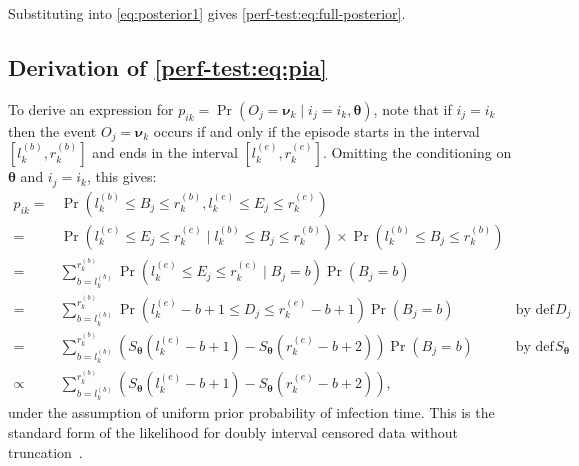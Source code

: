 \documentclass{article}
\def\dist{\sim}
\DeclareMathOperator{\prob}{\mathrm{Pr}}
\DeclareMathOperator{\NBr}{NegBin}
\newcommand{\NBc}{\NBr}
\newcommand\set{\mathcal}
\renewcommand{\vec}[1]{\bm{#1}}
\newcommand{\ntot}{n_\text{tot}}
\newcommand{\ndet}{n_\text{d}}
\newcommand{\pnodet}{p_\text{u}}
\newcommand{\na}{\vec{n}_\text{obs}}
\begin{document}
Substituting into \cref{eq:posterior1} gives \cref{perf-test:eq:full-posterior}.


\subsection{Derivation of \cref{perf-test:eq:pia}}

To derive an expression for $p_{ik} = \prob(O_j = \vec{\nu}_k \mid i_j = i_k, \vec{\theta})$, note that if $i_j = i_k$ then the event $O_j = \vec{\nu}_k$ occurs if and only if the episode starts in the interval $[l^{(b)}_k, r^{(b)}_k]$ and ends in the interval $[l^{(e)}_k, r^{(e)}_k]$.
Omitting the conditioning on $\vec{\theta}$ and $i_j = i_k$, this gives:
\begin{align}
p_{ik}
=& \prob \left( l_k^{(b)} \leq B_{j} \leq r_k^{(b)}, l_k^{(e)} \leq E_{j} \leq r_k^{(e)} \right) \\
=& \prob \left( l_k^{(e)} \leq E_{j} \leq r_k^{(e)} \mid l_k^{(b)} \leq B_{j} \leq r_k^{(b)} \right) \times\prob \left( l_k^{(b)} \leq B_{j} \leq r_k^{(b)} \right) \\
=& \sum_{b = l_k^{(b)}}^{r_k^{(b)}} \prob \left( l_k^{(e)} \leq E_{j} \leq r_k^{(e)} \mid B_{j} = b \right) \prob \left(B_{j} = b \right) \\
=& \sum_{b = l_k^{(b)}}^{r_k^{(b)}} \prob \left( l_k^{(e)} - b + 1 \leq D_{j} \leq r_k^{(e)} - b + 1 \right) \prob \left(B_{j} = b \right) &\text{by def of $D_{j}$} \\
=& \sum_{b = l_k^{(b)}}^{r_k^{(b)}} \left( S_{\vec{\theta}}(l_k^{(e)} - b + 1) - S_{\vec{\theta}}(r_k^{(e)} - b + 2) \right) \prob \left(B_{j} = b \right) &\text{by def of $S_{\vec{\theta}}$} \\
\propto& \sum_{b = l_k^{(b)}}^{r_k^{(b)}} \left( S_{\vec{\theta}}(l_k^{(e)} - b + 1) - S_{\vec{\theta}}(r_k^{(e)} - b + 2) \right),
\end{align}
under the assumption of uniform prior probability of infection time.
This is the standard form of the likelihood for doubly interval censored data without truncation~\citep[e.g.][]{sunEmpirical}.
\end{document}

